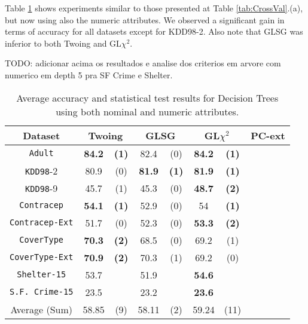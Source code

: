 Table \ref{exp:secondsetnumeric} shows experiments  similar to those presented at Table \ref{tab:CrossVal}.(a), but now
using also the numeric attributes. We observed a significant gain in terms of accuracy for all datasets except for KDD98-2. 
Also note that GLSG was inferior to both Twoing and GL$\chi^2$.

TODO: adicionar acima os resultados e analise dos criterios em arvore com numerico em depth 5 pra SF Crime e Shelter.

\begin{table}
\small
\caption{Average accuracy and statistical test results for  Decision Trees using both nominal and numeric attributes.}
\centering
\begin{tabular}{c|cc|cc|cc|cc} 
Dataset &        \multicolumn{2}{c|}{Twoing} &   \multicolumn{2}{c|}{GLSG} &   \multicolumn{2}{c|}{GL$\chi^2$} & \multicolumn{2}{c}{PC-ext}\\  \hline   
{\tt Adult}      &   {\bf 84.2 }  & {\bf (1) }    & 82.4  & (0)   &  {\bf 84.2} & {\bf (1) }  & &      \\
{\tt KDD98}-2      & 80.9   & (0)      & {\bf 81.9 }& {\bf (1)}   & {\bf 81.9}  & {\bf (1)}   & &     \\ 
{\tt KDD98}-9      & 45.7 &   (1)    & 45.3 &  (0)  & {\bf 48.7 }  &{\bf  (2)  }       & & \\ 
{\tt Contracep}  &{\bf  54.1  }&{\bf   (1)}      & 52.9   &  (0)  & 54    &{\bf  (1) }   & &  \\ 
{\tt Contracep-Ext}  & 51.7  &  (0)      & 52.3   &  (0) & {\bf 53.3 }   & {\bf (2) }   & & \\ 
{\tt CoverType}  &  {\bf 70.3 } &  {\bf  (2) }   &   68.5  &  (0)   &   69.2   &  (1)    & &  \\ 
{\tt CoverType-Ext}  & {\bf 70.9}   & {\bf (2) }     &  70.3    &  (1)  &  69.2     & (0)    & &  \\ 
{\tt Shelter-15}   &  53.7  &   & 51.9 &   & {\bf 54.6 }  &    &  &      \\   
{\tt S.F. Crime-15} & 23.5 &  & 23.2 &  & {\bf 23.6 } & & &    \\ 
\hline
Average (Sum)  & 58.85  &  (9)  & 58.11  &  (2)   &   59.24   &  (11) &  &

\end{tabular}
\label{exp:secondsetnumeric}
\normalsize
\end{table}


